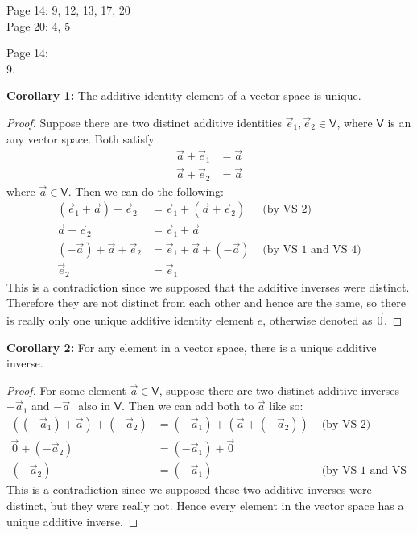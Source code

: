 \documentclass[11pt]{article}
\newcommand{\br}[1]{\left(#1\right)}
\begin{document}
Page 14: 9, 12, 13, 17, 20 \\
Page 20: 4, 5

Page 14: \\

9.

\textbf{Corollary 1:} The additive identity element of a vector space is unique. 
\begin{proof}
    Suppose there are two distinct additive identities $\vec{e}_1, \vec{e}_2 \in \mathsf{V}$, where $\mathsf{V}$ is an any vector space. Both satisfy \begin{align*}
        \vec{a} + \vec{e}_1 &= \vec{a} \\
        \vec{a} + \vec{e}_2 &= \vec{a}
    \end{align*}
    where $\vec{a}\in\mathsf{V}$. Then we can do the following: \begin{align*}
        \br{\vec{e}_1 + \vec{a}} + \vec{e}_2 &= \vec{e}_1 + \br{\vec{a} + \vec{e}_2} &\text{ (by VS 2)}\\
        \vec{a} + \vec{e}_2 &= \vec{e}_1 + \vec{a} \\
        \br{-\vec{a}} + \vec{a} + \vec{e}_2 &= \vec{e}_1 + \vec{a} + \br{-\vec{a}} &\text{ (by VS 1 and VS 4)} \\
        \vec{e}_2 &= \vec{e}_1
    \end{align*} This is a contradiction since we supposed that the additive inverses were distinct. Therefore they are not distinct from each other and hence are the same, so there is really only one unique additive identity element $e$, otherwise denoted as $\vec{0}$.
\end{proof}

\textbf{Corollary 2:} For any element in a vector space, there is a unique additive inverse.
\begin{proof}
    For some element $\vec{a}\in\mathsf{V}$, suppose there are two distinct additive inverses $-\vec{a}_1$ and $-\vec{a}_1$ also in $\mathsf{V}$. Then we can add both to $\vec{a}$ like so: \begin{align*}
        \br{\br{-\vec{a}_1} + \vec{a}} + \br{-\vec{a}_2} &= \br{-\vec{a}_1} + \br{\vec{a} + \br{-\vec{a}_2}} &\text{ (by VS 2)} \\
        \vec{0} + \br{-\vec{a}_2} &= \br{-\vec{a}_1} + \vec{0} \\
        \br{-\vec{a}_2} &= \br{-\vec{a}_1} &\text{ (by VS 1 and VS 3)}
    \end{align*} This is a contradiction since we supposed these two additive inverses were distinct, but they were really not. Hence every element in the vector space has a unique additive inverse.
\end{proof}
\end{document}
